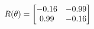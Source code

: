 \documentclass[preview]{standalone}
\begin{document}
\begin{align*}
\special{dvisvgm:raw <g id='unique000'>}R(\theta) = \begin{bmatrix}-0.16 & -0.99\\0.99 & -0.16\end{bmatrix}\special{dvisvgm:raw </g>}
\end{align*}
\end{document}
